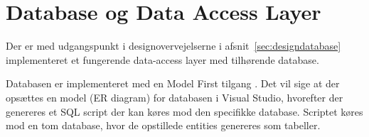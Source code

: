 \section{Database og Data Access Layer}

Der er med udgangspunkt i designovervejelserne i afsnit~\ref{sec:designdatabase} implementeret et fungerende data-access layer med tilhørende database.

Databasen er implementeret med en Model First tilgang \cite{microsoftdatadevelopercenter2016}. Det vil sige at der opsættes en model (ER diagram) for databasen i Visual Studio, hvorefter der genereres et SQL script der kan køres mod den specifikke database. Scriptet køres mod en tom database, hvor de opstillede entities genereres som tabeller.

%	
%		
%
%		
